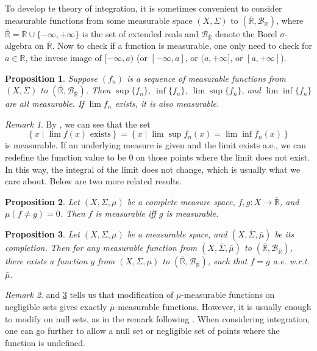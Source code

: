 \documentclass[openany]{book}
\newtheorem{proposition}{Proposition}[chapter]
\theoremstyle{definition}
\theoremstyle{remark}
\newtheorem*{remark}{Remark}
\begin{document}
To develop te theory of integration, it is sometimes convenient to consider measurable functions from some measurable space $(X,\Sigma)$ to $(\overline{\mathbb{R}},\mathcal{B}_{\overline{\mathbb{R}}})$, where $\overline{\mathbb{R}}=\mathbb{R}\cup\{-\infty,+\infty\}$ is the set of extended reals and $\mathcal{B}_{\overline{\mathbb{R}}}$ denote the Borel $\sigma$-algebra on $\overline{\mathbb{R}}$. Now to check if a function is measurable, one only need to check for $a\in \mathbb{R}$, the invese image of $[-\infty,a)$ (or $[-\infty,a]$, or $(a,+\infty]$, or $[a,+\infty]$).
\begin{proposition}\label{prop:limMeasurable}
    Suppose $(f_n)$ is a sequence of measurable functions from $(X,\Sigma)$ to $(\overline{\mathbb{R}},\mathcal{B}_{\overline{\mathbb{R}}})$. Then $\sup\{f_n\}$, $\inf\{f_n\}$, $\lim\sup\{f_n\}$, and $\lim\inf\{f_n\}$ are all measurable. If $\lim f_n$ exists, it is also measurable.
\end{proposition}
\begin{remark}
    By , we can see that the set
    \begin{equation*}
        \left\{x\middle|\lim f(x)\textrm{ exists}\right\}=\left\{x\middle|\lim\sup f_n(x)=\lim\inf f_n(x)\right\}
    \end{equation*}
    is measurable. If an underlying measure is given and the limit exists a.e., we can redefine the function value to be $0$ on those points where the limit does not exist. In this way, the integral of the limit does not change, which is usually what we care about. Below are two more related results.
\end{remark}
\begin{proposition}\label{prop:nullDiff}
    Let $(X,\Sigma,\mu)$ be a complete measure space, $f,g:X\to\overline{\mathbb{R}}$, and $\mu(f\ne g)=0$. Then $f$ is measurable iff $g$ is measurable.
\end{proposition}
\begin{proposition}\label{prop:negligibleDiff}
    Let $(X,\Sigma,\mu)$ be a measurable space, and $(X,\overline{\Sigma},\bar{\mu})$ be its completion. Then for any measurable function from $(X,\overline{\Sigma},\bar{\mu})$ to $(\overline{\mathbb{R}},\mathcal{B}_{\overline{\mathbb{R}}})$, there exists a function $g$ from $(X,\Sigma,\mu)$ to $(\overline{\mathbb{R}},\mathcal{B}_{\overline{\mathbb{R}}})$, such that $f=g$ a.e. w.r.t. $\bar{\mu}$.
\end{proposition}
\begin{remark}
     and \ref{prop:negligibleDiff} tells us that modification of $\mu$-measurable functions on negligible sets gives exactly $\bar{\mu}$-measurable functions. However, it is usually enough to modify on null sets, as in the remark following . When considering integration, one can go further to allow a null set or negligible set of points where the function is undefined.
\end{remark}
\end{document}
